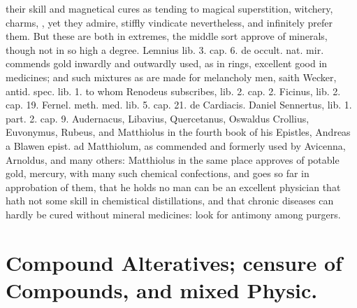 {their skill and magnetical cures as tending to magical superstition,
witchery, charms, \etc{}, yet they admire, stiffly vindicate nevertheless,
and infinitely prefer them. But these are both in extremes, the middle
sort approve of minerals, though not in so high a degree. Lemnius lib.
3. cap. 6. de occult. nat. mir. commends gold inwardly and outwardly
used, as in rings, excellent good in medicines; and such mixtures as
are made for melancholy men, saith Wecker, antid. spec. lib. 1. to whom
Renodeus subscribes, lib. 2. cap. 2. Ficinus, lib. 2. cap. 19. Fernel.
meth. med. lib. 5. cap. 21. de Cardiacis. Daniel Sennertus, lib. 1.
part. 2. cap. 9. Audernacus, Libavius, Quercetanus, Oswaldus Crollius,
Euvonymus, Rubeus, and Matthiolus in the fourth book of his Epistles,
Andreas a Blawen epist. ad Matthiolum, as commended and formerly used
by Avicenna, Arnoldus, and many others: Matthiolus in the same
place approves of potable gold, mercury, with many such chemical
confections, and goes so far in approbation of them, that he holds
 no man can be an excellent physician that hath not some skill in
chemistical distillations, and that chronic diseases can hardly be
cured without mineral medicines: look for antimony among purgers.

\section[Compound Alteratives]{Compound Alteratives; censure of Compounds, and mixed
Physic.}

}
